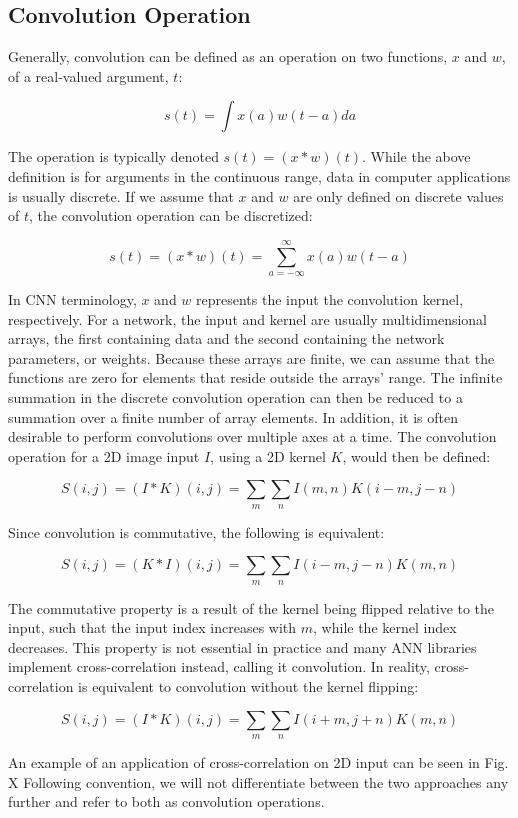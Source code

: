 \subsection{Convolution Operation}

Generally, convolution can be defined as an operation on two functions, $x$ and $w$, of a real-valued argument, $t$:

\[ s(t) = \int x(a)w(t-a) da \]

\noindent The operation is typically denoted $s(t) = (x*w)(t)$. While the above definition is for arguments in the continuous range, data in computer applications is usually discrete. If we assume that $x$ and $w$ are only defined on discrete values of $t$, the convolution operation can be discretized:

\[ s(t) = (x*w)(t) = \sum_{a=-\infty}^{\infty} x(a)w(t-a) \]

\noindent In CNN terminology, $x$ and $w$ represents the input the convolution kernel, respectively. For a network, the input and kernel are usually multidimensional arrays, the first containing data and the second containing the network parameters, or weights. Because these arrays are finite, we can assume that the functions are zero for elements that reside outside the arrays' range. The infinite summation in the discrete convolution operation can then be reduced to a summation over a finite number of array elements. In addition, it is often desirable to perform convolutions over multiple axes at a time. The convolution operation for a 2D image input $I$, using a 2D kernel $K$, would then be defined:

\[ S(i, j) = (I*K)(i, j) = \sum_{m} \sum_{n} I(m, n) K(i-m, j-n) \]

\noindent Since convolution is commutative, the following is equivalent:

\[ S(i, j) = (K*I)(i, j) = \sum_{m} \sum_{n} I(i-m, j-n) K(m, n) \]

\noindent The commutative property is a result of the kernel being flipped relative to the input, such that the input index increases with $m$, while the kernel index decreases. This property is not essential in practice and many ANN libraries implement cross-correlation instead, calling it convolution. In reality, cross-correlation is equivalent to convolution without the kernel flipping:

\[ S(i, j) = (I*K)(i, j) = \sum_{m} \sum_{n} I(i+m, j+n) K(m, n) \]

\noindent An example of an application of cross-correlation on 2D input can be seen in Fig. X Following convention, we will not differentiate between the two approaches any further and refer to both as convolution operations. 
 
